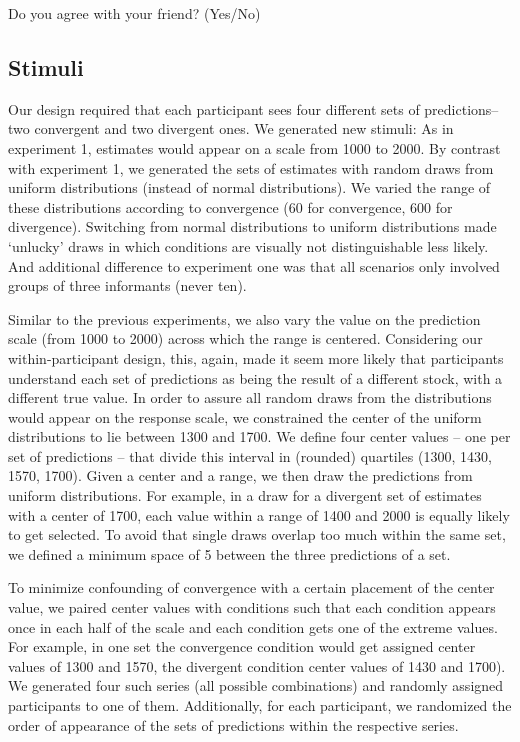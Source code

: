 \documentclass[
  doc,floatsintext]{apa6}
\begin{document}
Do you agree with your friend? (Yes/No)

\subsection{Stimuli}\label{stimuli-1}

Our design required that each participant sees four different sets of predictions--two convergent and two divergent ones. We generated new stimuli: As in experiment 1, estimates would appear on a scale from 1000 to 2000. By contrast with experiment 1, we generated the sets of estimates with random draws from uniform distributions (instead of normal distributions). We varied the range of these distributions according to convergence (60 for convergence, 600 for divergence). Switching from normal distributions to uniform distributions made `unlucky' draws in which conditions are visually not distinguishable less likely. And additional difference to experiment one was that all scenarios only involved groups of three informants (never ten).

Similar to the previous experiments, we also vary the value on the prediction scale (from 1000 to 2000) across which the range is centered. Considering our within-participant design, this, again, made it seem more likely that participants understand each set of predictions as being the result of a different stock, with a different true value. In order to assure all random draws from the distributions would appear on the response scale, we constrained the center of the uniform distributions to lie between 1300 and 1700. We define four center values -- one per set of predictions -- that divide this interval in (rounded) quartiles (1300, 1430, 1570, 1700). Given a center and a range, we then draw the predictions from uniform distributions. For example, in a draw for a divergent set of estimates with a center of 1700, each value within a range of 1400 and 2000 is equally likely to get selected. To avoid that single draws overlap too much within the same set, we defined a minimum space of 5 between the three predictions of a set.

To minimize confounding of convergence with a certain placement of the center value, we paired center values with conditions such that each condition appears once in each half of the scale and each condition gets one of the extreme values. For example, in one set the convergence condition would get assigned center values of 1300 and 1570, the divergent condition center values of 1430 and 1700). We generated four such series (all possible combinations) and randomly assigned participants to one of them. Additionally, for each participant, we randomized the order of appearance of the sets of predictions within the respective series.
\end{document}
